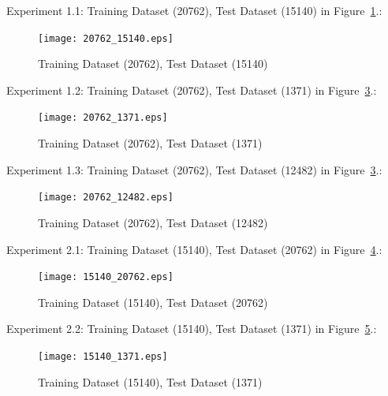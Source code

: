 








\iffalse
Experiment 1.1: Training Dataset  (20762), Test Dataset  (15140) in Figure~\ref{fig:fig1}.:
\begin{figure}[h]
\centering
\texttt{[image: 20762\_15140.eps]}
\caption{Training Dataset  (20762), Test Dataset  (15140)}
\label{fig:fig1}
\end{figure}

Experiment 1.2: Training Dataset  (20762), Test Dataset  (1371) in Figure~\ref{fig:fig2}.:
\begin{figure}[h]
\centering
\texttt{[image: 20762\_1371.eps]}
\caption{Training Dataset  (20762), Test Dataset  (1371)}
\label{fig:fig2}
\end{figure}

Experiment 1.3: Training Dataset  (20762), Test Dataset  (12482) in Figure~\ref{fig:fig2}.:
\begin{figure}[h]
\centering
\texttt{[image: 20762\_12482.eps]}
\caption{ Training Dataset  (20762), Test Dataset  (12482)}
\label{fig:fig2}
\end{figure}

Experiment 2.1: Training Dataset  (15140), Test Dataset  (20762) in Figure~\ref{fig:fig3}.:
\begin{figure}[h]
\centering
\texttt{[image: 15140\_20762.eps]}
\caption{Training Dataset  (15140), Test Dataset  (20762)}
\label{fig:fig3}
\end{figure}

Experiment 2.2: Training Dataset  (15140), Test Dataset  (1371) in Figure~\ref{fig:fig4}.:
\begin{figure}[h]
\centering
\texttt{[image: 15140\_1371.eps]}
\caption{Training Dataset  (15140), Test Dataset  (1371)}
\label{fig:fig4}
\end{figure}

